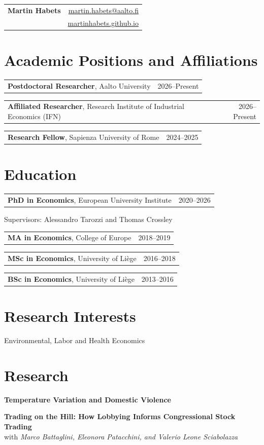\documentclass[10pt,a4paper]{article}
\makeatletter
\newcommand{\entry}[2]{%
  \begin{tabularx}{\textwidth}{@{}>{\raggedright\arraybackslash}X@{\hspace{5mm}}r@{}}
    #1 & #2
  \end{tabularx}\par
}
\makeatother
\begin{document}
\begin{tabularx}{\textwidth}{@{}Xr@{}}
  {\LARGE\bfseries Martin Habets}
    & \href{mailto:martin.habets@aalto.fi}{martin.habets@aalto.fi}\\
    & \href{https://martinhabets.github.io/}{martinhabets.github.io}
\end{tabularx}

\section*{Academic Positions and Affiliations}

\entry{\textbf{Postdoctoral Researcher}, Aalto University}{2026--Present}
\entry{\textbf{Affiliated Researcher}, Research Institute of Industrial Economics (IFN)}{2026--Present}
\entry{\textbf{Research Fellow}, Sapienza University of Rome}{2024--2025}

\section*{Education}

\entry{\textbf{PhD in Economics}, European University Institute}{2020--2026}
Supervisors: Alessandro Tarozzi and Thomas Crossley
\par\vspace{4pt}

\entry{\textbf{MA in Economics}, College of Europe}{2018--2019}
\entry{\textbf{MSc in Economics}, University of Li\`ege}{2016--2018}
\entry{\textbf{BSc in Economics}, University of Li\`ege}{2013--2016}

\section*{Research Interests}

Environmental, Labor and Health Economics

\section*{Research}

\textbf{Temperature Variation and Domestic Violence}
\par\vspace{8pt}

\textbf{Trading on the Hill: How Lobbying Informs Congressional Stock Trading}\\
with \textit{Marco Battaglini, Eleonora Patacchini, and Valerio Leone Sciabolazza}
\par\vspace{8pt}
\end{document}
